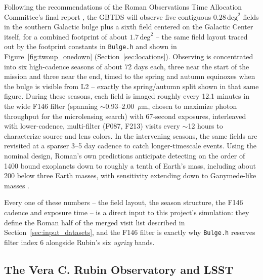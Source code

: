 \documentclass[english,10pt,a4paper]{article}
\begin{document}
	Following the recommendations of the Roman Observations Time Allocation Committee's final report \cite{ROTAC2025}, the GBTDS will observe five contiguous $0.28\,\mathrm{deg}^2$ fields in the southern Galactic bulge plus a sixth field centered on the Galactic Center itself, for a combined footprint of about $1.7\,\mathrm{deg}^2$ -- the same field layout traced out by the footprint constants in \texttt{Bulge.h} and shown in Figure~\ref{fig:twoup_onedown} (Section~\ref{sec:locations}). Observing is concentrated into six high-cadence seasons of about 72 days each, three near the start of the mission and three near the end, timed to the spring and autumn equinoxes when the bulge is visible from L2 -- exactly the spring/autumn split shown in that same figure. During these seasons, each field is imaged roughly every 12.1 minutes in the wide F146 filter (spanning $\sim$0.93--2.00~$\mu$m, chosen to maximize photon throughput for the microlensing search) with 67-second exposures, interleaved with lower-cadence, multi-filter (F087, F213) visits every $\sim$12 hours to characterize source and lens colors. In the intervening seasons, the same fields are revisited at a sparser 3--5 day cadence to catch longer-timescale events. Using the nominal design, Roman's own predictions anticipate detecting on the order of 1400 bound exoplanets down to roughly a tenth of Earth's mass, including about 200 below three Earth masses, with sensitivity extending down to Ganymede-like masses \cite{Spergel2015WFIRST}.
	
	Every one of these numbers -- the field layout, the season structure, the F146 cadence and exposure time -- is a direct input to this project's simulation: they define the Roman half of the merged visit list described in Section~\ref{sec:input_datasets}, and the F146 filter is exactly why \texttt{Bulge.h} reserves filter index 6 alongside Rubin's six \textit{ugrizy} bands.
	
	\subsection{The Vera C. Rubin Observatory and LSST}
	\label{subsec:rubin_overview}
	
\end{document}
